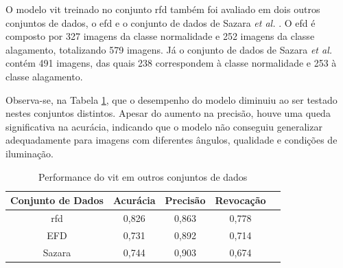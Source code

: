 O modelo \acrshort{vit} treinado no conjunto \acrshort{rfd} também foi avaliado em dois outros conjuntos de dados,
o \acrfull{efd} \cite{BarzSchroeterMuench2018_1000117723} e o conjunto de dados de Sazara \textit{et al.} \cite{sazara2019}.
O \acrshort{efd} é composto por 327 imagens da classe normalidade e 252 imagens da classe alagamento, totalizando 579 imagens.
Já o conjunto de dados de Sazara \textit{et al.} contém 491 imagens, das quais 238 correspondem à classe normalidade e 253 à classe alagamento.

Observa-se, na Tabela \ref{tab:vitperformance}, que o desempenho do modelo diminuiu ao ser testado nestes conjuntos distintos.
Apesar do aumento na precisão, houve uma queda significativa na acurácia, indicando que o modelo não conseguiu generalizar adequadamente para imagens com diferentes ângulos, qualidade e condições de iluminação.

\begin{table}[tb]
\caption{\label{tab:vitperformance} Performance do \acrshort{vit} em outros conjuntos de dados}
\begin{center}
\begin{tabular}{c|cccc}
\toprule
 Conjunto de Dados & Acurácia & Precisão & Revocação \\
\midrule
     \acrshort{rfd} & 0,826 & 0,863 & 0,778 \\
     EFD & 0,731 & 0,892 & 0,714 \\
     Sazara & 0,744 & 0,903 & 0,674 \\
\bottomrule
\end{tabular}
\end{center}
\end{table}